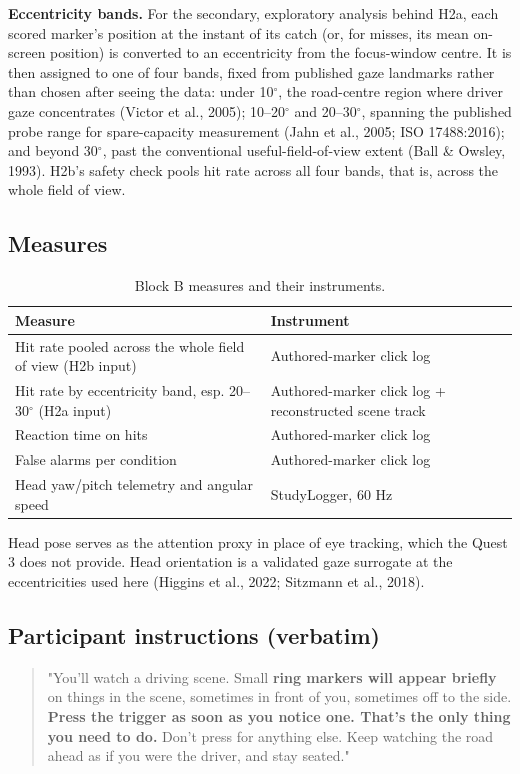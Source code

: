 \textbf{Eccentricity bands.} For the secondary, exploratory analysis behind H2a, each scored marker's
position at the instant of its catch (or, for misses, its mean on-screen position) is converted to an
eccentricity from the focus-window centre. It is then assigned to one of four bands, fixed from
published gaze landmarks rather than chosen after seeing the data: under 10$^{\circ}$, the road-centre
region where driver gaze concentrates (Victor et al., 2005); 10–20$^{\circ}$ and 20–30$^{\circ}$, spanning
the published probe range for spare-capacity measurement (Jahn et al., 2005;
ISO 17488:2016); and beyond 30$^{\circ}$,
past the conventional useful-field-of-view extent (Ball \& Owsley, 1993). H2b's safety check pools hit
rate across all four bands, that is, across the whole field of view.

\subsection{Measures}

\begin{longtable}{p{}|p{}}
\caption{Block B measures and their instruments.}\\
\hline
\textbf{Measure} & \textbf{Instrument} \\
\hline
\endhead
\hline
Hit rate pooled across the whole field of view (H2b input) & Authored-marker click log \\
Hit rate by eccentricity band, esp. 20–30$^{\circ}$ (H2a input) & Authored-marker click log + reconstructed scene track \\
Reaction time on hits & Authored-marker click log \\
False alarms per condition & Authored-marker click log \\
Head yaw/pitch telemetry and angular speed & StudyLogger, 60 Hz \\
\hline
\end{longtable}

Head pose serves as the attention proxy in place of eye tracking, which the Quest 3 does not provide.
Head orientation is a validated gaze surrogate at the eccentricities used here (Higgins et al., 2022;
Sitzmann et al., 2018).

\subsection{Participant instructions (verbatim)}

\begin{quote}
"You'll watch a driving scene. Small \textbf{ring markers will appear briefly} on things in the
scene, sometimes in front of you, sometimes off to the side. \textbf{Press the trigger as soon as
you notice one. That's the only thing you need to do.} Don't press for anything else. Keep watching
the road ahead as if you were the driver, and stay seated."
\end{quote}

